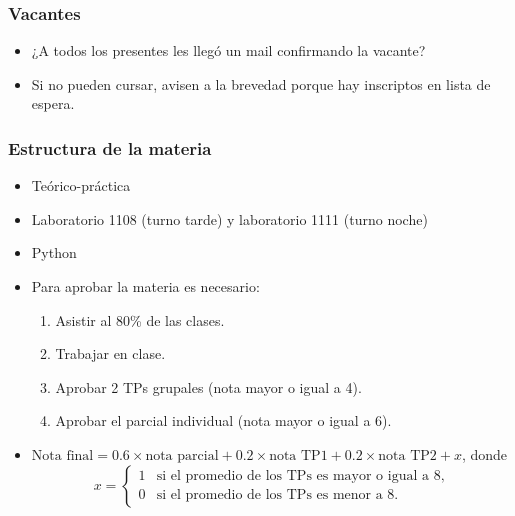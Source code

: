 \documentclass[aspectratio=169,12pt]{beamer}
\begin{document}
%
%
%
%

\begin{frame}
\frametitle{Vacantes}

\begin{itemize}
\item ¿A todos los presentes les llegó un mail confirmando la vacante?
\item Si no pueden cursar, avisen a la brevedad porque hay inscriptos en lista de espera.
\end{itemize}

\end{frame}


\begin{frame}
\frametitle{Estructura de la materia}

\begin{itemize}
\item Teórico-práctica
\item Laboratorio 1108 (turno tarde) y laboratorio 1111 (turno noche)
\item Python
\item Para aprobar la materia es necesario:
\begin{enumerate}
\item Asistir al 80\% de las clases.
\item Trabajar en clase.
\item Aprobar 2 TPs grupales (nota mayor o igual a 4).
\item Aprobar el parcial individual (nota mayor o igual a 6).
\end{enumerate}
\item $\text{Nota final} = 0.6 \times \text{nota parcial} + 0.2 \times \text{nota TP1} + 0.2 \times \text{nota TP2} +x$, donde
$$
x = \begin{cases}
1 & \text{si el promedio de los TPs es mayor o igual a 8,} \\
0 & \text{si el promedio de los TPs es menor a 8.}
\end{cases}
$$
\end{itemize}

\end{frame}
\end{document}
